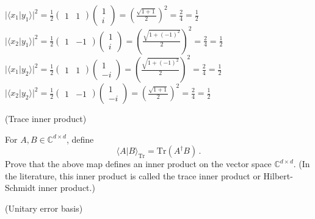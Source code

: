 \documentclass[12pt]{article}
\renewcommand{\>}{\rangle}
\newcommand{\<}{\langle}
\newcommand{\C}{\mathbb{C}}
\begin{document}
\noindent
$|\<x_1 | y_1 \>|^2 = \frac{1}{2} \left(\begin{array}{cc} 1 & 1 \end{array}\right)  \left(\begin{array}{cc} 1 \\ i\end{array}\right) = \left( \frac{\sqrt{1 + 1}}{2}\right)^2 = \frac{2}{4} = \frac{1}{2} $ \\
$|\<x_2 | y_1 \>|^2 = \frac{1}{2} \left(\begin{array}{cc} 1 & -1\end{array}\right)  \left(\begin{array}{cc} 1 \\ i\end{array}\right) = \left( \frac{\sqrt{1 + (-1)^2}}{2}\right)^2 = \frac{2}{4} = \frac{1}{2} $ \\
$|\<x_1 | y_2 \>|^2 = \frac{1}{2} \left(\begin{array}{cc} 1 & 1\end{array}\right)  \left(\begin{array}{cc} 1 \\ -i\end{array}\right) = \left( \frac{\sqrt{1 + (-1)^2}}{2}\right)^2 = \frac{2}{4} = \frac{1}{2} $ \\
$|\<x_2 | y_2 \>|^2 = \frac{1}{2} \left(\begin{array}{cc} 1 & -1\end{array}\right)  \left(\begin{array}{cc} 1 \\ -i\end{array}\right) = \left( \frac{\sqrt{1 + 1}}{2}\right)^2 = \frac{2}{4} = \frac{1}{2} $


\newpage


 (Trace inner product)

\medskip
\noindent
For $A,B\in\C^{d\times d}$, define
\[
\< A | B\>_{\mathrm{Tr}} = \mathrm{Tr}(A^\dagger B)\,.
\]
Prove that the above map defines an inner product on the vector space $\C^{d\times d}$. (In the literature, this inner product is called the trace inner product or Hilbert-Schmidt inner product.)

\newpage


 (Unitary error basis)
\end{document}
